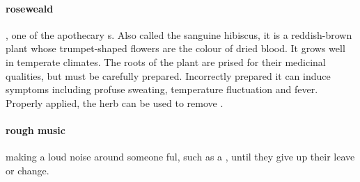 \paragraph{roseweald},  one of the apothecary s. Also called the sanguine hibiscus, it is a reddish-brown plant whose trumpet-shaped flowers are the colour of dried blood. It grows well in temperate climates. The roots of the plant are prised for their medicinal qualities, but must be carefully prepared. Incorrectly prepared it can induce symptoms including profuse sweating, temperature fluctuation and fever. Properly applied, the herb can be used to remove . 
\paragraph{rough music} making a loud noise around someone ful, such as a , until they give up their leave or change. 
